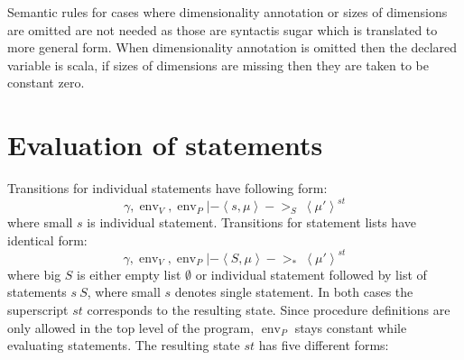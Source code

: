 \documentclass[a4paper, 10pt, draft]{report}
\begin{document}
Semantic rules for cases where dimensionality annotation or sizes of dimensions
are omitted are not needed as those are syntactis sugar which is translated to
more general form. When dimensionality annotation is omitted then the declared
variable is scala, if sizes of dimensions are missing then they are taken to be
constant zero.

\section{Evaluation of statements}\label{sec:semantics:statements}

Transitions for individual statements have following form:
\[
  \gamma, \operatorname{env}_V, \operatorname{env}_P |- \left\langle
    s, \mu
  \right\rangle ->_S\
  \left\langle
    \mu'
  \right\rangle ^{st}
\]
where small $s$ is individual statement.
Transitions for statement lists have identical form:
\[
  \gamma, \operatorname{env}_V, \operatorname{env}_P |- \left\langle
    S, \mu
  \right\rangle ->_{*}\
  \left\langle
    \mu'
  \right\rangle ^{st}
\]
where big $S$ is either empty list $\emptyset$ or individual statement followed
by list of statements $s\ S$, where small $s$ denotes single statement.  In
both cases the superscript $st$ corresponds to the resulting state. Since
procedure definitions are only allowed in the top level of the program,
$\operatorname{env}_P$ stays constant while evaluating statements. The
resulting state $st$ has five different forms:
\end{document}
